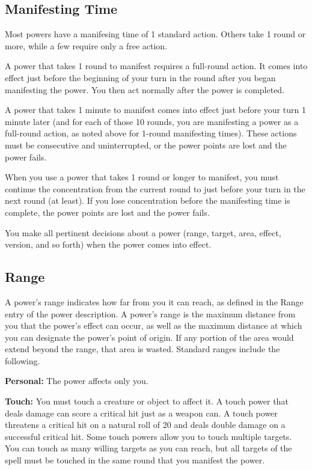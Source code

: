 % 

\subsection{Manifesting Time}
Most powers have a manifesing time of 1 standard action. Others take 1 round or more, while a few require only a free action.

A power that takes 1 round to manifest requires a full-round action. It comes into effect just before the beginning of your turn in the round after you began manifesting the power. You then act normally after the power is completed.

A power that takes 1 minute to manifest comes into effect just before your turn 1 minute later (and for each of those 10 rounds, you are manifesting a power as a full-round action, as noted above for 1-round manifesting times). These actions must be consecutive and uninterrupted, or the power points are lost and the power fails.

When you use a power that takes 1 round or longer to manifest, you must continue the concentration from the current round to just before your turn in the next round (at least). If you lose concentration before the manifesting time is complete, the power points are lost and the power fails.

You make all pertinent decisions about a power (range, target, area, effect, version, and so forth) when the power comes into effect.

\subsection{Range}
A power's range indicates how far from you it can reach, as defined in the Range entry of the power description. A power's range is the maximum distance from you that the power's effect can occur, as well as the maximum distance at which you can designate the power's point of origin. If any portion of the area would extend beyond the range, that area is wasted. Standard ranges include the following.

\textbf{Personal:} The power affects only you.

\textbf{Touch:} You must touch a creature or object to affect it. A touch power that deals damage can score a critical hit just as a weapon can. A touch power threatens a critical hit on a natural roll of 20 and deals double damage on a successful critical hit. Some touch powers allow you to touch multiple targets. You can touch as many willing targets as you can reach, but all targets of the spell must be touched in the same round that you manifest the power.

